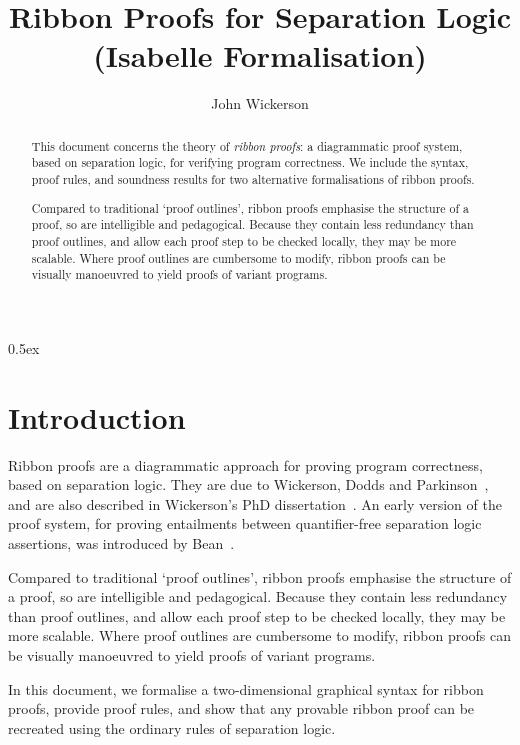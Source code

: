 \documentclass[11pt,a4paper]{article}
\begin{document}
\title{Ribbon Proofs for Separation Logic \\ (Isabelle Formalisation)}
\author{John Wickerson}
\maketitle

\begin{abstract}
This document concerns the theory of \emph{ribbon proofs}: a diagrammatic proof system, based on separation logic, for verifying program correctness. We include the syntax, proof rules, and soundness results for two alternative formalisations of ribbon proofs.

Compared to traditional `proof outlines', ribbon proofs emphasise the structure of a proof, so are intelligible and pedagogical. Because they contain less redundancy than proof outlines, and allow each proof step to be checked locally, they may be more scalable. Where proof outlines are cumbersome to modify, ribbon proofs can be visually manoeuvred to yield proofs of variant programs. 
\end{abstract}

\tableofcontents

\parindent 0pt\parskip 0.5ex

\section{Introduction}

Ribbon proofs are a diagrammatic approach for proving program correctness, based on separation logic. They are due to Wickerson, Dodds and Parkinson~\cite{wickerson+13}, and are also described in Wickerson's PhD dissertation~\cite{wickerson13}. An early version of the proof system, for proving entailments between quantifier-free separation logic assertions, was introduced by Bean~\cite{bean06}.

Compared to traditional `proof outlines', ribbon proofs emphasise the structure of a proof, so are intelligible and pedagogical. Because they contain less redundancy than proof outlines, and allow each proof step to be checked locally, they may be more scalable. Where proof outlines are cumbersome to modify, ribbon proofs can be visually manoeuvred to yield proofs of variant programs. 

In this document, we formalise a two-dimensional graphical syntax for ribbon proofs, provide proof rules, and show that any provable ribbon proof can be recreated using the ordinary rules of separation logic.
\end{document}
